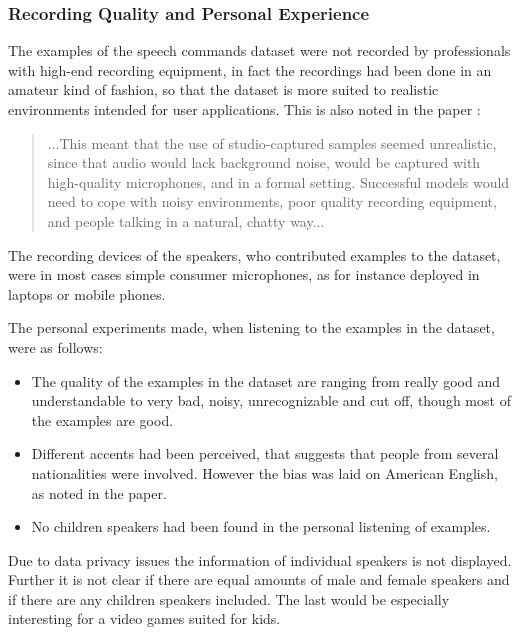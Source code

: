 \subsubsection{Recording Quality and Personal Experience}
The examples of the speech commands dataset \cite{Warden2018} were not recorded by professionals with high-end recording equipment, in fact the recordings had been done in an amateur kind of fashion, so that the dataset is more suited to realistic environments intended for user applications.
This is also noted in the paper \cite{Warden2018}:
\begin{quote}
...This meant that the use of studio-captured samples seemed unrealistic, since that audio would lack background noise, would be captured with high-quality microphones, and in a formal setting. 
Successful models would need to cope with noisy environments, poor quality recording equipment, and people talking in a natural, chatty way...
\end{quote}
The recording devices of the speakers, who contributed examples to the dataset, were in most cases simple consumer microphones, as for instance deployed in laptops or mobile phones.

The personal experiments made, when listening to the examples in the dataset, were as follows:
\begin{itemize}
  \item The quality of the examples in the dataset are ranging from really good and understandable to very bad, noisy, unrecognizable and cut off, though most of the examples are good.

  \item Different accents had been perceived, that suggests that people from several nationalities were involved. 
  However the bias was laid on American English, as noted in the paper.

  \item No children speakers had been found in the personal listening of examples.
\end{itemize}

Due to data privacy issues the information of individual speakers is not displayed.
Further it is not clear if there are equal amounts of male and female speakers and if there are any children speakers included.
The last would be especially interesting for a video games suited for kids.

